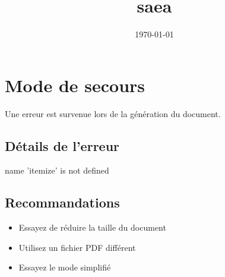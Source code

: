 \documentclass[12pt]{article}
\title{saea}
\author{}
\date{\today}
\begin{document}
\maketitle

\section{Mode de secours}
Une erreur est survenue lors de la génération du document.

\subsection{Détails de l'erreur}
name 'itemize' is not defined

\subsection{Recommandations}
\begin{itemize}
\item Essayez de réduire la taille du document
\item Utilisez un fichier PDF différent
\item Essayez le mode simplifié
\end{itemize}
\end{document}
